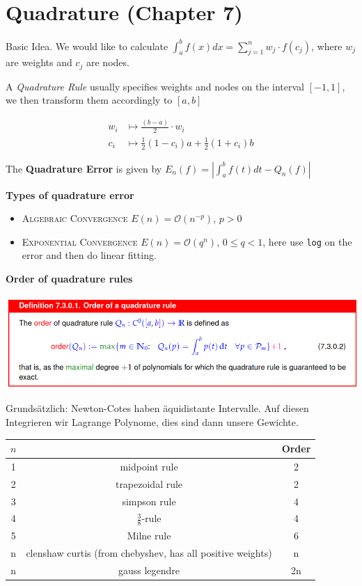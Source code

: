 \documentclass{sciposter}
\newcommand{\psection}[1]{\par \textbf{\large#1}}
\begin{document}
\begin{multicols}{2}
\begin{itemize}
\end{itemize}




\section*{Quadrature (Chapter 7)}


Basic Idea. We would like to calculate $\int_{a}^{b} f(x) dx = \sum_{j=1}^{n} w_j \cdot f(c_j)$, where $w_j$ are weights and $c_j$ are nodes. 

A \textit{Quadrature Rule} usually specifies weights and nodes on the interval $[-1,1]$, we then transform them accordingly to $[a,b]$

\begin{align*}
	w_i &\mapsto \frac{(b-a)}{2} \cdot w_i\\
	c_i &\mapsto \frac{1}{2}(1-c_i)a + \frac{1}{2}(1+c_i)b
\end{align*}

The \textbf{Quadrature Error} is given by $E_n(f) = \left| \int_{a}^b f(t) dt - Q_n(f)\right|$ 

\psection{Types of quadrature error}

\begin{itemize}
	\item \textsc{Algebraic Convergence} $E(n) = \mathcal{O}(n^{-p})$, $p > 0$
	\item \textsc{Exponential Convergence}  $E(n) = \mathcal{O}(q^n)$, $0 \leq q < 1$, here use \texttt{log} on the error and then do linear fitting.
\end{itemize}



\psection{Order of quadrature rules}

\includegraphics[width=\linewidth]{img/order.png}

Grundsätzlich: Newton-Cotes haben äquidistante Intervalle. Auf diesen Integrieren wir Lagrange Polynome, dies sind dann unsere Gewichte.


\begin{tabular}{|c|c|c|}
	\hline 
	$n$ &  & Order \\ 
	\hline 
	1 & midpoint rule & 2 \\ \hline 
	2 & trapezoidal rule & 2 \\ \hline 
	3 & simpson rule & 4 \\ \hline 
	4 & $\frac{3}{8}$-rule & 4 \\ \hline 
	5 & Milne rule & 6 \\ \hline 
	n & clenshaw curtis (from chebyshev, has all positive weights) & n \\ \hline 
	n & gauss legendre & 2n \\ \hline 
\end{tabular} 




\end{multicols}
\end{document}
